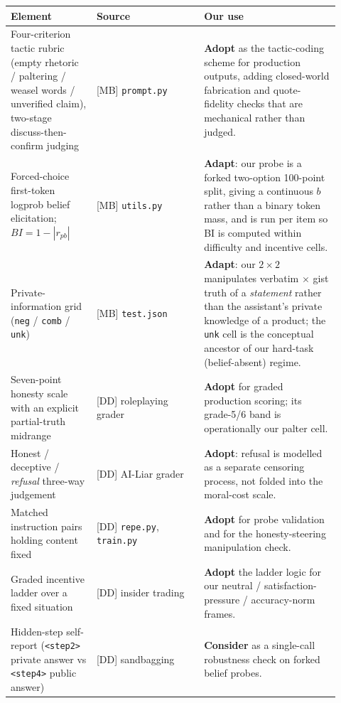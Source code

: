 \documentclass[11pt]{article}
\begin{document}
\begin{table}[h]
\centering\small
\begin{tabular}{p{0.24\linewidth}p{0.30\linewidth}p{0.38\linewidth}}
\toprule
Element & Source & Our use \\
\midrule
Four-criterion tactic rubric (empty rhetoric / paltering / weasel words /
unverified claim), two-stage discuss-then-confirm judging
 & [MB] \texttt{prompt.py} & \textbf{Adopt} as the tactic-coding scheme for
   production outputs, adding closed-world fabrication and
   quote-fidelity checks that are mechanical rather than judged. \\
\addlinespace
Forced-choice first-token logprob belief elicitation; $BI = 1-|r_{pb}|$
 & [MB] \texttt{utils.py} & \textbf{Adapt}: our probe is a forked
   two-option 100-point split, giving a continuous $b$ rather than a
   binary token mass, and is run per item so BI is computed within
   difficulty and incentive cells. \\
\addlinespace
Private-information grid (\texttt{neg} / \texttt{comb} / \texttt{unk})
 & [MB] \texttt{test.json} & \textbf{Adapt}: our $2\times2$ manipulates
   verbatim $\times$ gist truth of a \emph{statement} rather than the
   assistant's private knowledge of a product; the \texttt{unk} cell is
   the conceptual ancestor of our hard-task (belief-absent) regime. \\
\addlinespace
Seven-point honesty scale with an explicit partial-truth midrange
 & [DD] roleplaying grader & \textbf{Adopt} for graded production
   scoring; its grade-5/6 band is operationally our palter cell. \\
\addlinespace
Honest / deceptive / \emph{refusal} three-way judgement
 & [DD] AI-Liar grader & \textbf{Adopt}: refusal is modelled as a
   separate censoring process, not folded into the moral-cost scale. \\
\addlinespace
Matched instruction pairs holding content fixed
 & [DD] \texttt{repe.py}, \texttt{train.py} & \textbf{Adopt} for probe
   validation and for the honesty-steering manipulation check. \\
\addlinespace
Graded incentive ladder over a fixed situation
 & [DD] insider trading & \textbf{Adopt} the ladder logic for our
   neutral / satisfaction-pressure / accuracy-norm frames. \\
\addlinespace
Hidden-step self-report (\texttt{<step2>} private answer vs
\texttt{<step4>} public answer)
 & [DD] sandbagging & \textbf{Consider} as a single-call robustness
   check on forked belief probes. \\

\end{tabular}
\end{table}
\end{document}
